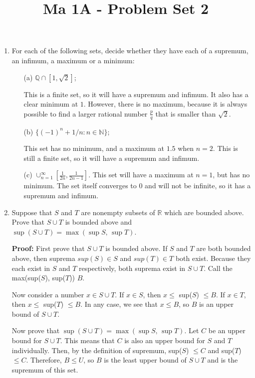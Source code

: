 \documentclass[11pt]{article}
\title{\vspace{-0.7cm}Ma 1A - Problem Set 2}
\date{}
\begin{document}
\maketitle

\begin{enumerate}

\item
For each of the following sets, decide whether they have each of a supremum, an infimum, a maximum or a minimum:
\begin{itemize}
\item[(a)] $\mathbb{Q} \cap [1, \sqrt{2}]$;

\bigskip
This is a finite set, so it will have a supremum and infimum. It also has a clear minimum at $1$. However, there is no maximum, because it is always possible to find a larger rational number $\frac{p}{q}$ that is smaller than $\sqrt{2}$. 

\item[(b)] $\{(-1)^n + 1/n : n \in \mathbb{N}\}$;

\bigskip
This set has no minimum, and a maximum at $1.5$ when $n=2$. This is still a finite set, so it will have a supremum and infimum. 

\item[(c)] $\cup_{n=1}^\infty [\frac{1}{2n}, \frac{1}{2n-1}]$.
This set will have a maximum at $n = 1$, but has no minimum. The set itself converges to $0$ and will not be infinite, so it has a supremum and infimum. 
\end{itemize}

\item
Suppose that $S$ and $T$ are nonempty subsets of $\mathbb{R}$ which are bounded above. Prove that $S \cup T$ is bounded above and $\sup (S\cup T) = \max(\sup S, \, \sup T)$.

\bigskip
\textbf{Proof: } First prove that $S \cup T$ is bounded above. If $S$ and $T$ are both bounded above, then suprema $sup(S) \in S$ and $sup(T) \in T$ both exist. Because they each exist in $S$ and $T$ respectively, both suprema exist in $S \cup T$. Call the max(sup($S$), sup($T$)) $B$. 

\medskip
Now consider a number $x \in S\cup T$. If $x \in S$, then $x \leq $ sup($S$) $\leq B$. If $x \in T$, then $x \leq $ sup($T$) $\leq B$. In any case, we see that $x \leq B$, so $B$ is an upper bound of $S\cup T$. 

\medskip Now prove that $\sup (S\cup T) = \max(\sup S, \, \sup T)$. Let $ C $ be an upper bound for $S\cup T$. This means that $C$ is also an upper bound for $S$ and $T$ individually. Then, by the definition of supremum, sup($S$) $\leq C$ and sup($T$) $\leq C$. Therefore, $B \leq U$, so $B$ is the least upper bound of $S\cup T$ and is the supremum of this set. 


\end{enumerate}
\end{document}
